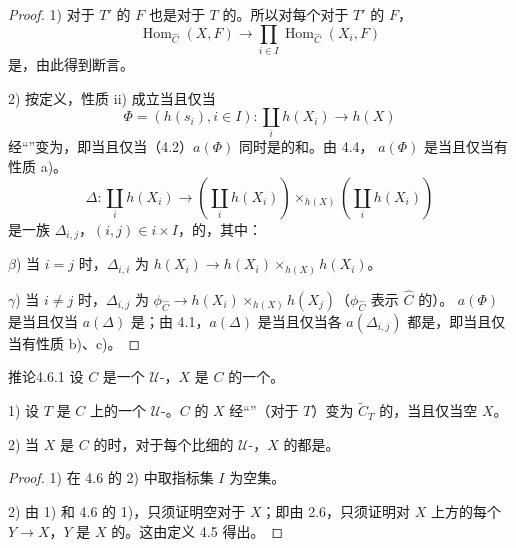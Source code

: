 \begin{proof}
1) 对于 $T'$ 的 $F$ 也是对于 $T$ 的。所以对每个对于 $T'$ 的 $F$，
\[\operatorname{Hom}_{\widehat C}(X,F)\longrightarrow\prod_{i\in I}\operatorname{Hom}_{\widehat C}(X_i,F)\]
是，由此得到断言。

2) 按定义，性质 ii) 成立当且仅当
\[\Phi=(h(s_i),i\in I):\coprod_i h(X_i)\longrightarrow h(X)\]
经“”变为，即当且仅当（4.2）$a(\Phi)$ 同时是的和。由 4.4， $a(\Phi)$ 是当且仅当有性质 a)。
\[\Delta:\coprod_i h(X_i)\longrightarrow
\left(\coprod_i h(X_i)\right)\times_{h(X)}\left(\coprod_i h(X_i)\right)\]
是一族 $\Delta_{i,j}$，$(i,j)\in i\times I$，的，其中：
\par $\beta$) 当 $i=j$ 时，$\Delta_{i,i}$ 为 $h(X_i)\to h(X_i)\times_{h(X)}h(X_i)$。
\par $\gamma$) 当 $i\ne j$ 时，$\Delta_{i,j}$ 为 $\phi_{\widehat C}\to h(X_i)\times_{h(X)}h(X_j)$（$\phi_{\widehat C}$ 表示 $\widehat C$ 的）。
 $a(\Phi)$ 是当且仅当 $a(\Delta)$ 是；由 4.1，$a(\Delta)$ 是当且仅当各 $a(\Delta_{i,j})$ 都是，即当且仅当有性质 b)、c)。
\end{proof}
\begin{SGAresult}{推论}{4.6.1}
设 $C$ 是一个 $\mathcal U$-，$X$ 是 $C$ 的一个。
\par 1) 设 $T$ 是 $C$ 上的一个 $\mathcal U$-。$C$ 的 $X$ 经“”（对于 $T$）变为 $\widetilde C_T$ 的，当且仅当空 $X$。
\par 2) 当 $X$ 是 $C$ 的时，对于每个比细的 $\mathcal U$-，$X$ 的都是。
\end{SGAresult}
\begin{proof}
1) 在 4.6 的 2) 中取指标集 $I$ 为空集。
\par 2) 由 1) 和 4.6 的 1)，只须证明空对于 $X$；即由 2.6，只须证明对 $X$ 上方的每个 $Y\to X$，$Y$ 是 $X$ 的。这由定义 4.5 得出。
\end{proof}
